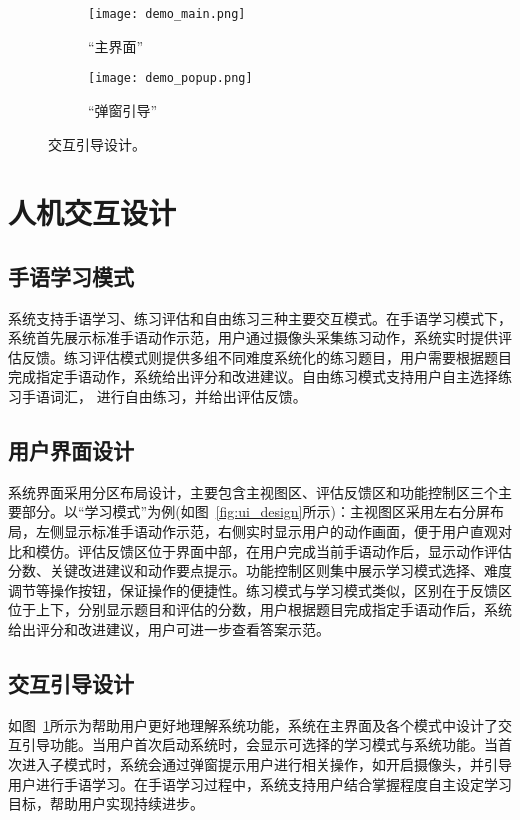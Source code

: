 \begin{figure}
  \centering
  \begin{subfigure}[b]{0.48\linewidth}
      \centering
      \texttt{[image: demo\_main.png]}
      \caption{“主界面”}
  \end{subfigure}
  \hfill
  \begin{subfigure}[b]{0.48\linewidth}
      \centering
      \texttt{[image: demo\_popup.png]}
      \caption{“弹窗引导”}
  \end{subfigure}
  \caption{交互引导设计。}
  \label{fig:ui_interaction}
\end{figure}

\section{人机交互设计}

\subsection{手语学习模式}
系统支持手语学习、练习评估和自由练习三种主要交互模式。在手语学习模式下，系统首先展示标准手语动作示范，用户通过摄像头采集练习动作，系统实时提供评估反馈。练习评估模式则提供多组不同难度系统化的练习题目，用户需要根据题目完成指定手语动作，系统给出评分和改进建议。自由练习模式支持用户自主选择练习手语词汇，%
进行自由练习，并给出评估反馈。

\subsection{用户界面设计}
系统界面采用分区布局设计，主要包含主视图区、评估反馈区和功能控制区三个主要部分。以“学习模式”为例(如图~\ref{fig:ui_design}所示)：主视图区采用左右分屏布局，左侧显示标准手语动作示范，右侧实时显示用户的动作画面，便于用户直观对比和模仿。评估反馈区位于界面中部，在用户完成当前手语动作后，显示动作评估分数、关键改进建议和动作要点提示。功能控制区则集中展示学习模式选择、难度调节等操作按钮，保证操作的便捷性。练习模式与学习模式类似，区别在于反馈区位于上下，分别显示题目和评估的分数，用户根据题目完成指定手语动作后，系统给出评分和改进建议，用户可进一步查看答案示范。



\subsection{交互引导设计}
如图~\ref{fig:ui_interaction}所示为帮助用户更好地理解系统功能，系统在主界面及各个模式中设计了交互引导功能。当用户首次启动系统时，会显示可选择的学习模式与系统功能。当首次进入子模式时，系统会通过弹窗提示用户进行相关操作，如开启摄像头，并引导用户进行手语学习。在手语学习过程中，系统支持用户结合掌握程度自主设定学习目标，帮助用户实现持续进步。


